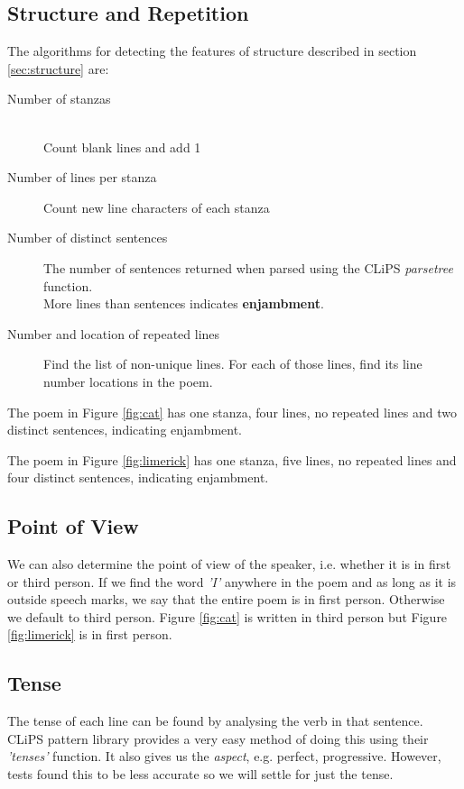 \subsection{Structure and Repetition}

The algorithms for detecting the features of structure described in section \ref{sec:structure} are:

\begin{description}
\item[Number of stanzas] \hfill \\
Count blank lines and add 1
\item[Number of lines per stanza]
Count new line characters of each stanza
\item[Number of distinct sentences]
The number of sentences returned when parsed using the CLiPS\cite{de2012pattern} \textit{parsetree} function.  \hfill \\
More lines than sentences indicates \textbf{enjambment}.
\item[Number and location of repeated lines]
Find the list of non-unique lines. For each of those lines, find its line number locations in the poem.

\end{description}

The poem in Figure \ref{fig:cat} has one stanza, four lines, no repeated lines and two distinct sentences, indicating enjambment.

The poem in Figure \ref{fig:limerick} has one stanza, five lines, no repeated lines and four distinct sentences, indicating enjambment.

\subsection{Point of View}

We can also determine the point of view of the speaker, i.e. whether it is in first or third person. If we find the word \textit{'I'} anywhere in the poem and as long as it is outside speech marks, we say that the entire poem is in first person. Otherwise we default to third person. Figure \ref{fig:cat} is written in third person but Figure \ref{fig:limerick} is in first person.

\subsection{Tense}

The tense of each line can be found by analysing the verb in that sentence. CLiPS pattern library provides a very easy method of doing this using their \textit{'tenses'} function. It also gives us the \textit{aspect}, e.g. perfect, progressive. However, tests found this to be less accurate so we will settle for just the tense.

